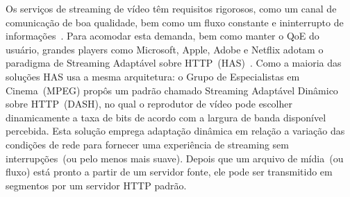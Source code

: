 Os serviços de streaming de vídeo têm requisitos rigorosos, como um canal de comunicação de boa qualidade, bem como um fluxo constante e ininterrupto de informações~\cite{Immich2018WinNet}.
Para acomodar esta demanda, bem como manter o QoE do usuário, grandes players como Microsoft, Apple, Adobe e Netflix adotam o paradigma de Streaming Adaptável sobre HTTP~(HAS)~\cite{company:dashs}. Como a maioria das soluções HAS usa a mesma arquitetura: o Grupo de Especialistas em Cinema~(MPEG) propôs um padrão chamado Streaming Adaptável Dinâmico sobre HTTP~(DASH), no qual o reprodutor de vídeo pode escolher dinamicamente a taxa de bits de acordo com a largura de banda disponível percebida.
Esta solução emprega adaptação dinâmica em relação a variação das condições de rede para fornecer uma experiência de streaming sem interrupções~(ou pelo menos mais suave). Depois que um arquivo de mídia~(ou fluxo) está pronto a partir de um servidor fonte, ele pode ser transmitido em segmentos por um servidor HTTP padrão.


